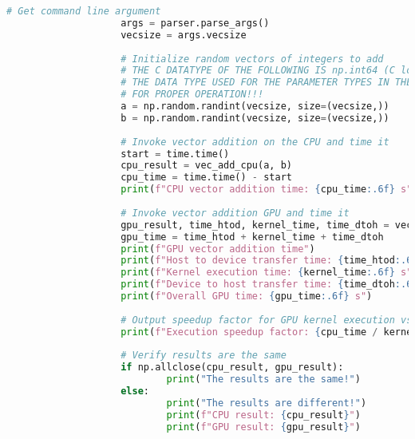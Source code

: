 \documentclass[11pt,twoside]{article}
\begin{document}
\begin{enumerate}
\begin{lstlisting}[language=Python,caption={Comparing vector addition using the CPU vs. the GPU with pyCUDA},stepnumber=2]
					# Get command line argument
					args = parser.parse_args()
					vecsize = args.vecsize
			
					# Initialize random vectors of integers to add
					# THE C DATATYPE OF THE FOLLOWING IS np.int64 (C long*), NOT C int* (np.int32)
					# THE DATA TYPE USED FOR THE PARAMETER TYPES IN THE KERNEL PARAMETERS IS IMPORTANT
					# FOR PROPER OPERATION!!!
					a = np.random.randint(vecsize, size=(vecsize,))
					b = np.random.randint(vecsize, size=(vecsize,))
			
					# Invoke vector addition on the CPU and time it
					start = time.time()
					cpu_result = vec_add_cpu(a, b)
					cpu_time = time.time() - start
					print(f"CPU vector addition time: {cpu_time:.6f} s")
			
					# Invoke vector addition GPU and time it
					gpu_result, time_htod, kernel_time, time_dtoh = vec_add_gpu(a, b, vecsize)
					gpu_time = time_htod + kernel_time + time_dtoh
					print(f"GPU vector addition time")
					print(f"Host to device transfer time: {time_htod:.6f} s")
					print(f"Kernel execution time: {kernel_time:.6f} s")
					print(f"Device to host transfer time: {time_dtoh:.6f} s")
					print(f"Overall GPU time: {gpu_time:.6f} s")
			
					# Output speedup factor for GPU kernel execution vs CPU
					print(f"Execution speedup factor: {cpu_time / kernel_time:.2f}x")
			
					# Verify results are the same
					if np.allclose(cpu_result, gpu_result):
							print("The results are the same!")
					else:
							print("The results are different!")
							print(f"CPU result: {cpu_result}")
							print(f"GPU result: {gpu_result}")	
			

\end{lstlisting}
\end{enumerate}
\end{document}
